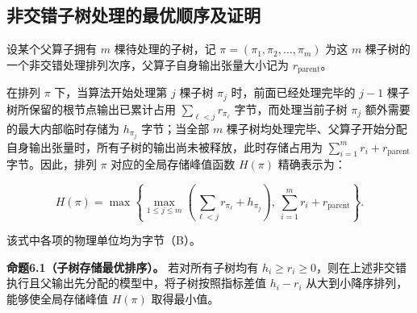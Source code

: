 \documentclass[anonymous,withtoc]{gmcm2026}
\begin{document}
\subsection{非交错子树处理的最优顺序及证明}

设某个父算子拥有 \(m\) 棵待处理的子树，记 \(\pi = (\pi_1, \pi_2, \dots, \pi_m)\) 为这 \(m\) 棵子树的一个非交错处理排列次序，父算子自身输出张量大小记为 \(r_{\mathrm{parent}}\)。

在排列 \(\pi\) 下，当算法开始处理第 \(j\) 棵子树 \(\pi_j\) 时，前面已经处理完毕的 \(j - 1\) 棵子树所保留的根节点输出已累计占用 \(\sum_{\ell < j} r_{\pi_\ell}\) 字节，而处理当前子树 \(\pi_j\) 额外需要的最大内部临时存储为 \(h_{\pi_j}\) 字节；当全部 \(m\) 棵子树均处理完毕、父算子开始分配自身输出张量时，所有子树的输出尚未被释放，此时存储占用为 \(\sum_{i=1}^m r_i + r_{\mathrm{parent}}\) 字节。因此，排列 \(\pi\) 对应的全局存储峰值函数 \(H(\pi)\) 精确表示为：

\begin{equation}
H(\pi) = \max \left\{ \max_{1 \le j \le m} \left( \sum_{\ell < j} r_{\pi_\ell} + h_{\pi_j} \right), \ \sum_{i=1}^m r_i + r_{\mathrm{parent}} \right\}.
\end{equation}

该式中各项的物理单位均为字节（B）。

\textbf{命题6.1（子树存储最优排序）。} 若对所有子树均有 \(h_i \ge r_i \ge 0\)，则在上述非交错执行且父输出先分配的模型中，将子树按照指标差值 \(h_i - r_i\) 从大到小降序排列，能够使全局存储峰值 \(H(\pi)\) 取得最小值。
\end{document}
